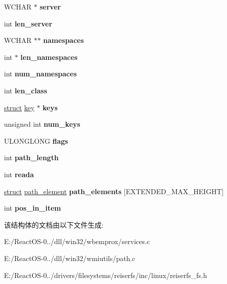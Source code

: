 \begin{DoxyCompactItemize}
W\+C\+H\+AR $\ast$ {\bfseries server}
\item 
\mbox{\label{structpath_aaa1b60349eb5adfde790af6e7d0b82f5}} 
int {\bfseries len\+\_\+server}
\item 
\mbox{\label{structpath_ab0146b754dfab1d21e83c6d918c94995}} 
W\+C\+H\+AR $\ast$$\ast$ {\bfseries namespaces}
\item 
\mbox{\label{structpath_ad64889cc8ad9a1781067c168d9ad6856}} 
int $\ast$ {\bfseries len\+\_\+namespaces}
\item 
\mbox{\label{structpath_abc41a615446c0c7808b1e8407b8f075a}} 
int {\bfseries num\+\_\+namespaces}
\item 
\mbox{\label{structpath_ac93da46a686c23e701916df4f1672527}} 
int {\bfseries len\+\_\+class}
\item 
\mbox{\label{structpath_a3665c5279f81aa9de83c7edb4b8e2f19}} 
\hyperlink{interfacestruct}{struct} \hyperlink{structkey}{key} $\ast$ {\bfseries keys}
\item 
\mbox{\label{structpath_ada10df62dfbad707ab93cb74dbaa50d7}} 
unsigned int {\bfseries num\+\_\+keys}
\item 
\mbox{\label{structpath_a87dd5a34e7429af31df856da1fef0e29}} 
U\+L\+O\+N\+G\+L\+O\+NG {\bfseries flags}
\item 
\mbox{\label{structpath_a47aaec48c7e93862e9380565c4609658}} 
int {\bfseries path\+\_\+length}
\item 
\mbox{\label{structpath_a3cbca50772a9099b3e3dbfe680c16ea8}} 
int {\bfseries reada}
\item 
\mbox{\label{structpath_a2fc65aa349b0964c45dc122c4f3c4492}} 
\hyperlink{interfacestruct}{struct} \hyperlink{structpath__element}{path\+\_\+element} {\bfseries path\+\_\+elements} \mbox{[}E\+X\+T\+E\+N\+D\+E\+D\+\_\+\+M\+A\+X\+\_\+\+H\+E\+I\+G\+HT\mbox{]}
\item 
\mbox{\label{structpath_a44aebdaf7d9f445bc010b11404a4f3b1}} 
int {\bfseries pos\+\_\+in\+\_\+item}
\end{DoxyCompactItemize}


该结构体的文档由以下文件生成\+:\begin{DoxyCompactItemize}
\item 
E\+:/\+React\+O\+S-\/0../dll/win32/wbemprox/services.\+c\item 
E\+:/\+React\+O\+S-\/0../dll/win32/wmiutils/path.\+c\item 
E\+:/\+React\+O\+S-\/0../drivers/filesystems/reiserfs/inc/linux/reiserfs\+\_\+fs.\+h\end{DoxyCompactItemize}
